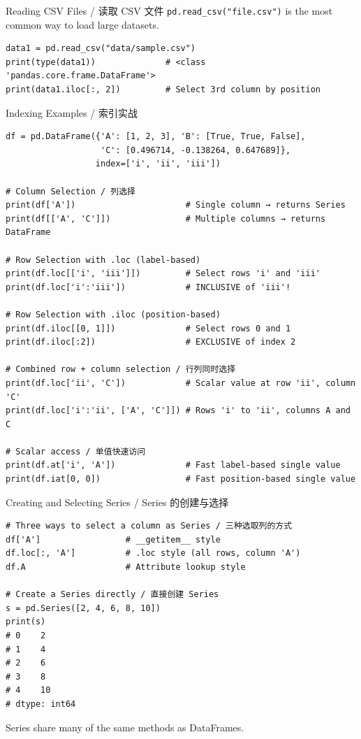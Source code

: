 \documentclass[11pt,a4paper]{report}
\let\oldtexttt\texttt
\renewcommand{\texttt}[1]{\textcolor{mainblue}{\oldtexttt{#1}}}
\begin{document}
\begin{examplebox}{Reading CSV Files / 读取 CSV 文件}
    \texttt{pd.read\_csv("file.csv")} is the most common way to load large datasets.
\begin{lstlisting}
data1 = pd.read_csv("data/sample.csv")
print(type(data1))              # <class 'pandas.core.frame.DataFrame'>
print(data1.iloc[:, 2])         # Select 3rd column by position
\end{lstlisting}
\end{examplebox}

\begin{examplebox}{Indexing Examples / 索引实战}
\begin{lstlisting}
df = pd.DataFrame({'A': [1, 2, 3], 'B': [True, True, False],
                   'C': [0.496714, -0.138264, 0.647689]},
                  index=['i', 'ii', 'iii'])

# Column Selection / 列选择
print(df['A'])                      # Single column → returns Series
print(df[['A', 'C']])               # Multiple columns → returns DataFrame

# Row Selection with .loc (label-based)
print(df.loc[['i', 'iii']])         # Select rows 'i' and 'iii'
print(df.loc['i':'iii'])            # INCLUSIVE of 'iii'!

# Row Selection with .iloc (position-based)
print(df.iloc[[0, 1]])              # Select rows 0 and 1
print(df.iloc[:2])                  # EXCLUSIVE of index 2

# Combined row + column selection / 行列同时选择
print(df.loc['ii', 'C'])            # Scalar value at row 'ii', column 'C'
print(df.loc['i':'ii', ['A', 'C']]) # Rows 'i' to 'ii', columns A and C

# Scalar access / 单值快速访问
print(df.at['i', 'A'])              # Fast label-based single value
print(df.iat[0, 0])                 # Fast position-based single value
\end{lstlisting}
\end{examplebox}

\begin{examplebox}{Creating and Selecting Series / Series 的创建与选择}
\begin{lstlisting}
# Three ways to select a column as Series / 三种选取列的方式
df['A']                 # __getitem__ style
df.loc[:, 'A']          # .loc style (all rows, column 'A')
df.A                    # Attribute lookup style

# Create a Series directly / 直接创建 Series
s = pd.Series([2, 4, 6, 8, 10])
print(s)
# 0    2
# 1    4
# 2    6
# 3    8
# 4    10
# dtype: int64
\end{lstlisting}
    Series share many of the same methods as DataFrames.
\end{examplebox}
\end{document}
